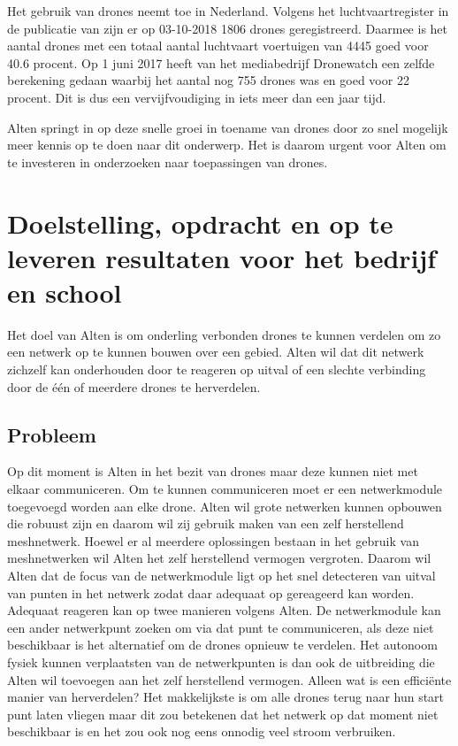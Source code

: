 \documentclass[a4paper, 11pt, oneside]{report}
\begin{document}
Het gebruik van drones neemt toe in Nederland.
Volgens het luchtvaartregister in de publicatie van  zijn er op 03-10-2018 1806 drones geregistreerd. 
Daarmee is het aantal drones met een totaal aantal luchtvaart voertuigen van 4445 goed voor 40.6 procent.
Op 1 juni 2017 heeft  van het mediabedrijf Dronewatch een zelfde berekening gedaan waarbij het aantal nog 755 drones was en goed voor 22 procent. Dit is dus een vervijfvoudiging in iets meer dan een jaar tijd.

Alten springt in op deze snelle groei in toename van drones door zo snel mogelijk meer kennis op te doen naar dit onderwerp.
Het is daarom urgent voor Alten om te investeren in onderzoeken naar toepassingen van drones.

\chapter{Doelstelling, opdracht en op te leveren resultaten voor het bedrijf en school}
\label{chapter:doelstelling}
Het doel van Alten is om onderling verbonden drones te kunnen verdelen om zo een netwerk op te kunnen bouwen over een gebied. 
Alten wil dat dit netwerk zichzelf kan onderhouden door te reageren op uitval of een slechte verbinding door de één of meerdere drones te herverdelen.

\section{Probleem}
Op dit moment is Alten in het bezit van drones maar deze kunnen niet met elkaar communiceren.
Om te kunnen communiceren moet er een netwerkmodule toegevoegd worden aan elke drone.
Alten wil grote netwerken kunnen opbouwen die robuust zijn en daarom wil zij gebruik maken van een zelf herstellend meshnetwerk.
Hoewel er al meerdere oplossingen bestaan in het gebruik van meshnetwerken wil Alten het zelf herstellend vermogen vergroten. 
Daarom wil Alten dat de focus van de netwerkmodule ligt op het snel detecteren van uitval van punten in het netwerk zodat daar adequaat op gereageerd kan worden.
Adequaat reageren kan op twee manieren volgens Alten.
De netwerkmodule kan een ander netwerkpunt zoeken om via dat punt te communiceren, als deze niet beschikbaar is het alternatief om de drones opnieuw te verdelen.
Het autonoom fysiek kunnen verplaatsten van de netwerkpunten is dan ook de uitbreiding die Alten wil toevoegen aan het zelf herstellend vermogen.
Alleen wat is een efficiënte manier van herverdelen?
Het makkelijkste is om alle drones terug naar hun start punt laten vliegen maar dit zou betekenen dat het netwerk op dat moment niet beschikbaar is en het zou ook nog eens onnodig veel stroom verbruiken.
\end{document}
